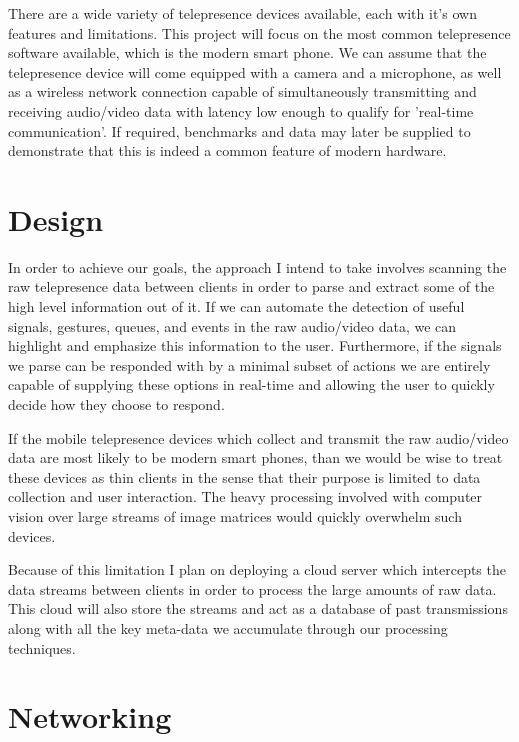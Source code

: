 \documentclass[a4paper,12pt]{report}
\begin{document}
There are a wide variety of telepresence devices available, each with it's own features and limitations. This project will focus on the most common telepresence software available, which is the modern smart phone. We can assume that the telepresence device will come equipped with a camera and a microphone, as well as a wireless network connection capable of simultaneously transmitting and receiving audio/video data with latency low enough to qualify for 'real-time communication'. If required, benchmarks and data may later be supplied to demonstrate that this is indeed a common feature of modern hardware.

\section{Design}

In order to achieve our goals, the approach I intend to take involves scanning the raw telepresence data between clients in order to parse and extract some of the high level information out of it. If we can automate the detection of useful signals, gestures, queues, and events in the raw audio/video data, we can highlight and emphasize this information to the user. Furthermore, if the signals we parse can be responded with by a minimal subset of actions we are entirely capable of supplying these options in real-time and allowing the user to quickly decide how they choose to respond.
 
If the mobile telepresence devices which collect and transmit the raw audio/video data are most likely to be modern smart phones, than we would be wise to treat these devices as thin clients in the sense that their purpose is limited to data collection and user interaction. The heavy processing involved with computer vision over large streams of image matrices would quickly overwhelm such devices.

Because of this limitation I plan on deploying a cloud server which intercepts the data streams between clients in order to process the large amounts of raw data. This cloud will also store the streams and act as a database of past transmissions along with all the key meta-data we accumulate through our processing techniques.

\section{Networking}
\end{document}
